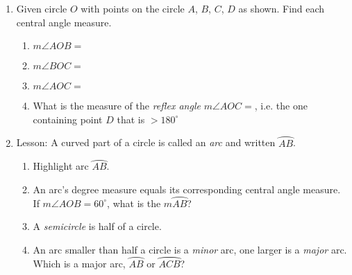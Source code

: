 \documentclass[12pt, twoside]{article}
\begin{document}
\begin{enumerate}
\newpage
\item Given circle $O$ with points on the circle $A$, $B$, $C$, $D$ as shown. Find each central angle measure.
  \begin{multicols}{2}
    \begin{enumerate} 
      \item $m\angle AOB =$
      \item $m\angle BOC =$
      \item $m\angle AOC =$
      \item What is the measure of the \emph{reflex angle} $m\angle AOC =$, i.e. the one containing point $D$ that is $>180^\circ$
      \end{enumerate}
  \end{multicols}

\newpage
\item Lesson: A curved part of a circle is called an \emph{arc} and written $\wideparen{AB}$.
    \begin{multicols}{2}
    \raggedcolumns
    \begin{enumerate}[itemsep=0.5cm]
      \item Highlight arc $\wideparen{AB}$.
      \item An arc's degree measure equals its corresponding central angle measure. \\[0.25cm]
      If $m\angle AOB = 60^\circ$, what is the $m \wideparen{AB}$?
      \item A \emph{semicircle} is half of a circle.
      \item An arc smaller than half a circle is a \emph{minor} arc, one larger is a \emph{major} arc. \\[0.25cm]
      Which is a major arc, $\wideparen{AB}$ or $\wideparen{ACB}$?
    \end{enumerate}
    \end{multicols}


\end{enumerate}
\end{document}
